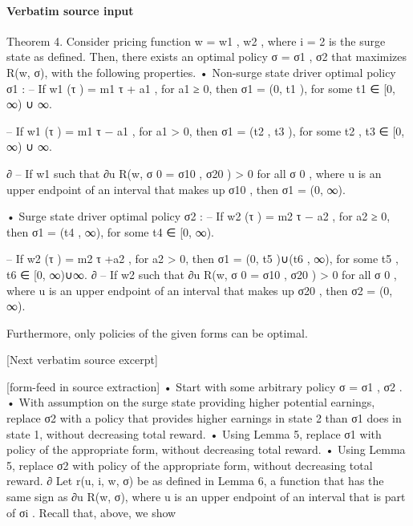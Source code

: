 \documentclass[10pt]{article}
\begin{document}
\paragraph{Verbatim source input}
\begin{ReviewVerbatim}
Theorem 4. Consider pricing function w = {w1 , w2 }, where i = 2 is the surge state as defined.
Then, there exists an optimal policy σ = {σ1 , σ2 } that maximizes R(w, σ), with the following properties.
• Non-surge state driver optimal policy σ1 :
– If w1 (τ ) = m1 τ + a1 , for a1 ≥ 0, then σ1 = (0, t1 ), for some t1 ∈ [0, ∞) ∪ {∞}.

– If w1 (τ ) = m1 τ − a1 , for a1 > 0, then σ1 = (t2 , t3 ), for some t2 , t3 ∈ [0, ∞) ∪ {∞}.

∂
– If w1 such that ∂u
R(w, σ 0 = {σ10 , σ20 }) > 0 for all σ 0 , where u is an upper endpoint of an
interval that makes up σ10 , then σ1 = (0, ∞).

• Surge state driver optimal policy σ2 :
– If w2 (τ ) = m2 τ − a2 , for a2 ≥ 0, then σ1 = (t4 , ∞), for some t4 ∈ [0, ∞).

– If w2 (τ ) = m2 τ +a2 , for a2 > 0, then σ1 = (0, t5 )∪(t6 , ∞), for some t5 , t6 ∈ [0, ∞)∪{∞}.
∂
– If w2 such that ∂u
R(w, σ 0 = {σ10 , σ20 }) > 0 for all σ 0 , where u is an upper endpoint of an
interval that makes up σ20 , then σ2 = (0, ∞).

Furthermore, only policies of the given forms can be optimal.

[Next verbatim source excerpt]


[form-feed in source extraction]
• Start with some arbitrary policy σ = {σ1 , σ2 }.
• With assumption on the surge state providing higher potential earnings, replace σ2 with a
policy that provides higher earnings in state 2 than σ1 does in state 1, without decreasing
total reward.
• Using Lemma 5, replace σ1 with policy of the appropriate form, without decreasing total
reward.
• Using Lemma 5, replace σ2 with policy of the appropriate form, without decreasing total
reward.
∂
Let r(u, i, w, σ) be as defined in Lemma 6, a function that has the same sign as ∂u
R(w, σ),
where u is an upper endpoint of an interval that is part of σi . Recall that, above, we show


\end{ReviewVerbatim}
\end{document}
